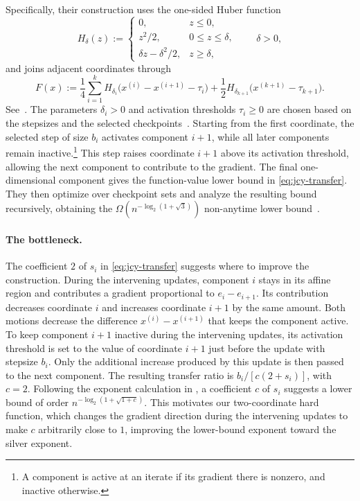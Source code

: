 \documentclass[11pt,letterpaper]{article}
\theoremstyle{definition}
\begin{document}
Specifically, their construction uses the one-sided Huber function
\begin{equation*}
  H_\delta(z):=
  \begin{cases}
    0,&z\le0,\\
    z^2/2,&0\le z\le\delta,\\
    \delta z-\delta^2/2,&z\ge\delta,
  \end{cases}
  \qquad \delta>0,
\end{equation*}
and joins adjacent coordinates through
\begin{equation*}
  F(x):=\frac14\sum_{i=1}^k
  H_{\delta_i}\bigl(x^{(i)}-x^{(i+1)}-\tau_i\bigr)
  +\frac12H_{\delta_{k+1}}\bigl(x^{(k+1)}-\tau_{k+1}\bigr).
\end{equation*}
See~\citep[Equation (4)]{JungChoYun2026}.
The parameters $\delta_i>0$ and activation thresholds $\tau_i\ge0$ are chosen based on the stepsizes and the selected checkpoints~\citep[Equation (27)]{JungChoYun2026}.
Starting from the first coordinate, the selected step of size $b_i$ activates component $i+1$, while all later components remain inactive.\footnote{A component is active at an iterate if its gradient there is nonzero, and inactive otherwise.}
This step raises coordinate $i+1$ above its activation threshold, allowing the next component to contribute to the gradient.
The final one-dimensional component gives the function-value lower bound in \eqref{eq:jcy-transfer}.
They then optimize over checkpoint sets and analyze the resulting bound recursively, obtaining the $\Omega(n^{-\log_2(1+\sqrt3)})$ non-anytime lower bound~\citep[Section~3]{JungChoYun2026}.

\paragraph{The bottleneck.}
The coefficient $2$ of $s_i$ in \eqref{eq:jcy-transfer} suggests where to improve the construction.
During the intervening updates, component $i$ stays in its affine region and contributes a gradient proportional to $e_i-e_{i+1}$.
Its contribution decreases coordinate $i$ and increases coordinate $i+1$ by the same amount.
Both motions decrease the difference $x^{(i)}-x^{(i+1)}$ that keeps the component active.
To keep component $i+1$ inactive during the intervening updates, its activation threshold is set to the value of coordinate $i+1$ just before the update with stepsize $b_i$.
Only the additional increase produced by this update is then passed to the next component.
The resulting transfer ratio is $b_i/[c(2+s_i)]$, with $c=2$.
Following the exponent calculation in \citet[Section~3]{JungChoYun2026}, a coefficient $c$ of $s_i$ suggests a lower bound of order $n^{-\log_2(1+\sqrt{1+c})}$.
This motivates our two-coordinate hard function, which changes the gradient direction during the intervening updates to make $c$ arbitrarily close to $1$, improving the lower-bound exponent toward the silver exponent.
\end{document}
